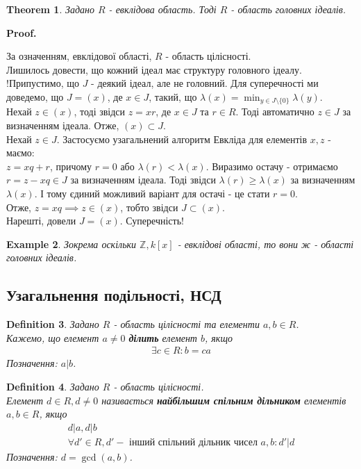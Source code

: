 \documentclass[a4paper, 10pt]{article}
\makeatletter
\theoremstyle{theoremdd}
\newtheorem{theorem}{Theorem}[subsection]
\theoremstyle{theoremdd}
\newtheorem{definition}[theorem]{Definition}
\theoremstyle{theoremdd}
\theoremstyle{theoremdd}
\newtheorem{example}[theorem]{Example}
\theoremstyle{theoremdd}
\theoremstyle{theoremdd}
\theoremstyle{theoremdd}
\theoremstyle{theoremdd}
\renewenvironment{proof}[1][Proof.\\]{\par
\pushQED{\hfill \qed}%
\normalfont \topsep6\p@\@plus6\p@\relax
\trivlist
\item\relax
{\bfseries
#1\@addpunct{.}}\hspace\labelsep\ignorespaces
}{%
\popQED\endtrivlist\@endpefalse
}
\makeatother
\begin{document}
\begin{theorem}
Задано $R$ - евклідова область. Тоді $R$ - область головних ідеалів.
\end{theorem}

\begin{proof}
За означенням, евклідової області, $R$ - область цілісності.\\
Лишилось довести, що кожний ідеал має структуру головного ідеалу.\\
!Припустимо, що $J$ - деякий ідеал, але не головний. Для суперечності ми доведемо, що $J = (x)$, де $x \in J$, такий, що $\lambda(x) = \displaystyle\min_{y \in J \setminus \{0\}} \lambda(y)$.\\
Нехай $z \in (x)$, тоді звідси $z = xr$, де $x \in J$ та $r \in R$. Тоді автоматично $z \in J$ за визначенням ідеала. Отже, $(x) \subset J$.\\
Нехай $z \in J$. Застосуємо узагальнений алгоритм Евкліда для елементів $x,z$ - маємо:\\
$z = xq + r$, причому $r = 0$ або $\lambda(r) < \lambda(x)$. Виразимо остачу - отримаємо\\
$r = z - xq \in J$ за визначенням ідеала. Тоді звідси $\lambda(r) \geq \lambda(x)$ за визначенням $\lambda(x)$. І тому єдиний можливий варіант для остачі - це стати $r = 0$.\\
Отже, $z = xq \implies z \in (x)$, тобто звідси $J \subset (x)$.\\
Нарешті, довели $J = (x)$. Суперечність!
\end{proof}

\begin{example}
Зокрема оскільки $\mathbb{Z}, k[x]$ - евклідові області, то вони ж - області головних ідеалів.
\end{example}

\subsection{Узагальнення подільності, НСД}
\begin{definition}
Задано $R$ - область цілісності та елементи $a,b \in R$.\\
Кажемо, що елемент $a \neq 0$ \textbf{ділить} елемент $b$, якщо
\begin{align*}
\exists c \in R: b = ca
\end{align*}
Позначення: $a | b$.
\end{definition}

\begin{definition}
Задано $R$ - область цілісності.\\
Елемент $d \in R, d \neq 0$ називається \textbf{найбільшим спільним дільником} елементів $a,b \in R$, якщо
\begin{align*}
d | a, d | b \\
\forall d' \in R, d' - \text{ інший спільний дільник чисел } a,b: d' | d
\end{align*}
Позначення: $d = \gcd (a,b)$.
\end{definition}
\end{document}
